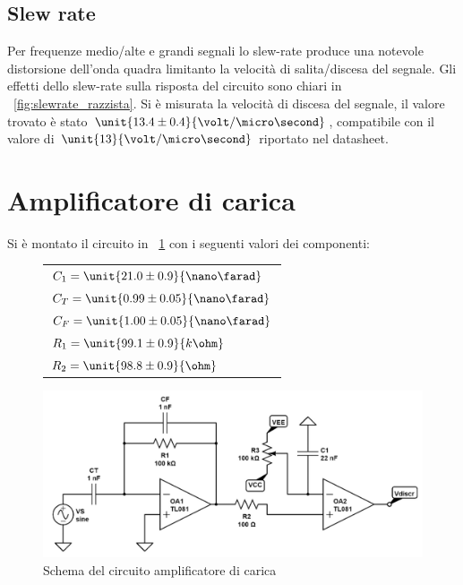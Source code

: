 \documentclass[10pt,a4paper]{article}
\begin{document}
\subsection{Slew rate}
Per frequenze medio/alte e grandi segnali lo slew-rate produce una notevole distorsione dell'onda quadra limitanto la velocità di salita/discesa del segnale. Gli effetti dello slew-rate sulla risposta del circuito sono chiari in \figurename{~\ref{fig:slewrate_razzista}}. Si è misurata la velocità di discesa del segnale, il valore trovato è stato $\unit{13.4 \pm 0.4}{\volt /\micro\second}$, compatibile con il valore di $\unit{13}{\volt / \micro\second}$ riportato nel datasheet.

\section{Amplificatore di carica}

Si è montato il circuito in \figurename{~\ref{circuio_ampli}} con i seguenti valori dei componenti:

\begin{figure}[H]
	\begin{minipage}{0.3\textwidth}
		\centering
		\begin{tabular}{l}
			$C_1 = \unit{21.0 \pm 0.9}{\nano\farad}$  \\ 
			$C_T = \unit{0.99 \pm 0.05}{\nano\farad}$ \\
			$C_F = \unit{1.00 \pm 0.05}{\nano\farad}$ \\
			$R_1 = \unit{99.1 \pm 0.9}{k\ohm}$  \\
			$R_2 = \unit{98.8 \pm 0.9}{\ohm}$
		\end{tabular}
	\end{minipage}
	\begin{minipage}{0.7\textwidth}
		\centering
		\includegraphics[width=\textwidth]{../circuiti/charge_amplifier.jpg}
		\caption{Schema del circuito amplificatore di carica}
		\label{circuio_ampli}
	\end{minipage}
\end{figure}
\end{document}

